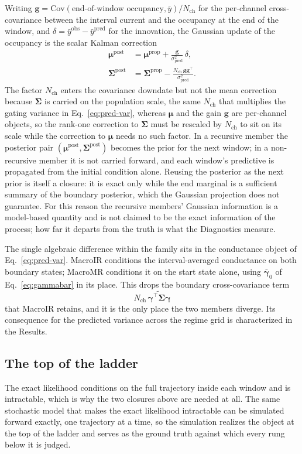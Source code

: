 Writing $\mathbf{g}=\mathrm{Cov}(\text{end-of-window occupancy}, \bar{y})/N_{\mathrm{ch}}$
for the per-channel cross-covariance between the interval current and the occupancy at the
end of the window, and $\delta = \bar{y}^{\mathrm{obs}} - \bar{y}^{\mathrm{pred}}$ for the
innovation, the Gaussian update of the occupancy is the scalar Kalman correction
\begin{align}
  \bm{\mu}^{\mathrm{post}} &= \bm{\mu}^{\mathrm{prop}} + \frac{\mathbf{g}}{\sigma^2_{\mathrm{pred}}}\,\delta, \label{eq:mu-post}\\
  \bm{\Sigma}^{\mathrm{post}} &= \bm{\Sigma}^{\mathrm{prop}} - \frac{N_{\mathrm{ch}}\,\mathbf{g}\mathbf{g}^\top}{\sigma^2_{\mathrm{pred}}}. \label{eq:sig-post}
\end{align}
The factor $N_{\mathrm{ch}}$ enters the covariance downdate but not the mean correction
because $\bm{\Sigma}$ is carried on the population scale, the same $N_{\mathrm{ch}}$ that
multiplies the gating variance in Eq.~\ref{eq:pred-var}, whereas $\bm{\mu}$ and the gain
$\mathbf{g}$ are per-channel objects, so the rank-one correction to $\bm{\Sigma}$ must be
rescaled by $N_{\mathrm{ch}}$ to sit on its scale while the correction to $\bm{\mu}$ needs
no such factor.
In a recursive member the posterior pair $(\bm{\mu}^{\mathrm{post}}, \bm{\Sigma}^{\mathrm{post}})$
becomes the prior for the next window; in a non-recursive member it is not carried forward,
and each window's predictive is propagated from the initial condition alone. Reusing the
posterior as the next prior is itself a closure: it is exact only while the end marginal is
a sufficient summary of the boundary posterior, which the Gaussian projection does not
guarantee. For this reason the recursive members' Gaussian information is a model-based
quantity and is not claimed to be the exact information of the process; how far it departs
from the truth is what the Diagnostics measure.

The single algebraic difference within the family sits in the conductance object of
Eq.~\ref{eq:pred-var}. MacroIR conditions the interval-averaged conductance on both
boundary states; MacroMR conditions it on the start state alone, using $\bar{\bm{\gamma}}_0$
of Eq.~\ref{eq:gammabar} in its place. This drops the boundary cross-covariance term
\begin{equation}
  N_{\mathrm{ch}}\,\widetilde{\bm{\gamma}^\top\bm{\Sigma}\bm{\gamma}}
  \label{eq:mr-ir}
\end{equation}
that MacroIR retains, and it is the only place the two members diverge. Its consequence for
the predicted variance across the regime grid is characterized in the Results.

\subsection*{The top of the ladder}

The exact likelihood conditions on the full trajectory inside each window and is
intractable, which is why the two closures above are needed at all. The same stochastic
model that makes the exact likelihood intractable can be simulated forward exactly, one
trajectory at a time, so the simulation realizes the object at the top of the ladder and
serves as the ground truth against which every rung below it is judged.
